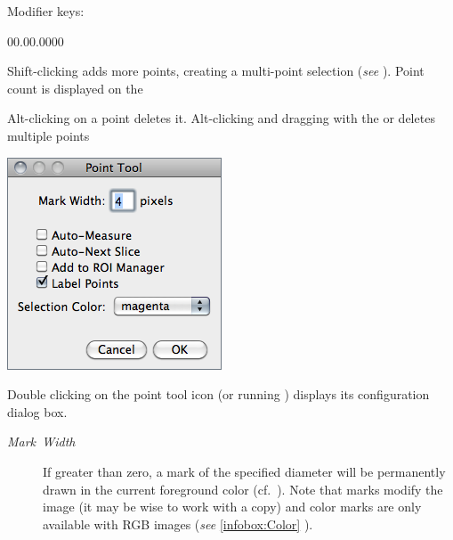 Modifier keys:
\begin{lyxlist}{00.00.0000}
\item [{\mykeystroke{Shift}}] \noindent Shift-clicking adds more points,
creating a multi-point selection (\emph{see} ).
Point count is displayed on the 
\item [{\mykeystroke{Alt}}] \noindent Alt-clicking on a point deletes
it. Alt-clicking and dragging with the 
or  deletes multiple points
\end{lyxlist}
\begin{minipage}[c][1\totalheight][t]{0.35\columnwidth}%
\includegraphics[scale=0.55]{images/PointOptions}%
\end{minipage}%
\begin{minipage}[c][1\totalheight][t]{0.65\columnwidth}%
Double clicking on the point tool icon (or running \textsf{})
displays its configuration dialog box.
\begin{description}
\item [{\emph{Mark\ Width}}] If greater than zero, a mark of the specified
diameter will be permanently drawn in the current foreground color
(cf.\ \textsf{}).
Note that marks modify the image (it may be wise to work with a copy)
and color marks are only available with RGB images (\emph{see} \ref{infobox:Color}
).\end{description}
%
\end{minipage}
